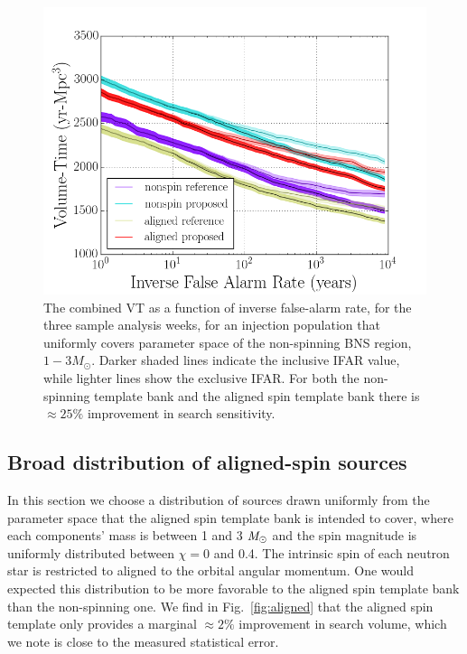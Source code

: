 \begin{figure}
\centering
\includegraphics[width=1.0\textwidth]{papers/bns_o1_dev/figures/ns_combined.png}
\caption{\label{fig:nonspin} 
The combined VT as a function of inverse false-alarm rate, for the
three sample analysis weeks, for an injection population that uniformly covers parameter space of the non-spinning BNS region, $1- 3M_\odot$. Darker shaded lines indicate the inclusive IFAR value, while lighter lines show the exclusive IFAR. For both the non-spinning template bank and the aligned spin template bank there is $\approx 25 \%$ improvement in search sensitivity.
}
\end{figure}

\subsection{Broad distribution of aligned-spin sources}
\label{sec:baligned}

In this section we choose a distribution of sources drawn uniformly from the parameter space that the aligned spin template bank is intended to cover, where each components' mass is between 1 and 3 $\mathit{M}_\odot$ and the spin magnitude is uniformly distributed between $\chi=$0 and 0.4. The intrinsic spin of each neutron star is restricted to aligned to the orbital angular momentum. One would expected this distribution to be more favorable to the aligned spin template bank than the non-spinning one. We find in Fig.~\ref{fig:aligned} that the aligned spin template only provides a marginal $\approx 2\%$ improvement in search volume, which we note is close to the measured statistical error. 

